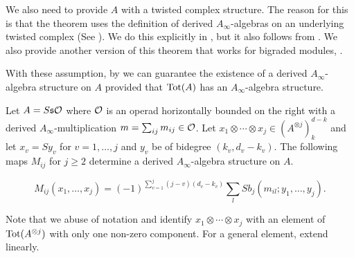 \documentclass[join.tex]{subfiles}
\begin{document}
We also need to provide $A$ with a twisted complex structure. The reason for this is that the theorem uses the definition of derived $A_\infty$-algebras on an underlying twisted complex (See ). We do this explicitly in , but it also follows from . We also provide another version of this theorem that works for bigraded modules, . 

With these assumption, by  we can guarantee the existence of a derived $A_\infty$-algebra structure on $A$ provided that $\mathrm{Tot}(A)$ has an $A_\infty$-algebra structure.




\begin{thm}\label{derivedmaps}
Let $A=S\mathfrak{s}{\mathcal O}$ where ${\mathcal O}$ is an operad horizontally bounded on the right with a derived $A_\infty$-multiplication $m=\sum_{ij}m_{ij}\in{\mathcal O}$. Let $x_1\otimes\cdots\otimes x_j\in (A^{\otimes j})^{d-k}_k$ and let $x_v = Sy_v$ for $v=1,\dots, j$ and $y_v$ be of bidegree $(k_v,d_v-k_v)$. The following maps $M_{ij}$ for $j\geq 2$ determine a derived $A_\infty$-algebra structure on $A$.

\[M_{ij}(x_1,\dots,x_j)= (-1)^{\sum_{v=1}^j(j-v)(d_v-k_v)}\sum_lSb_j(m_{il};y_1,\dots, y_j). \]
\end{thm}
Note that we abuse of notation and identify $x_1\otimes\cdots\otimes x_j$ with an element of $\mathrm{Tot}(A^{\otimes j})$ with only one non-zero component. For a general element, extend linearly.
\end{document}
